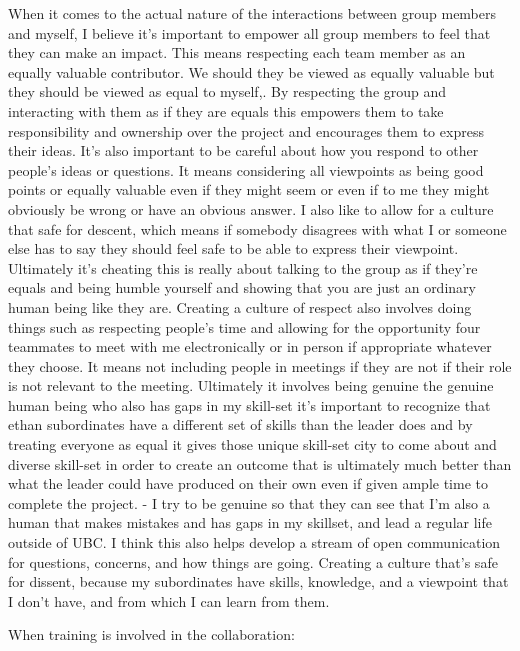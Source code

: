\documentclass[]{article}
\begin{document}
When it comes to the actual nature of the interactions between group members and myself, I believe it's important to empower all group members to feel that they can make an impact. This means respecting each team member as an equally valuable contributor. We should they be viewed as equally valuable but they should be viewed as equal to myself,. By respecting the group and interacting with them as if they are equals this empowers them to take responsibility and ownership over the project and encourages them to express their ideas. It's also important to be careful about how you respond to other people's ideas or questions. It means considering all viewpoints as being good points or equally valuable even if they might seem or even if to me they might obviously be wrong or have an obvious answer. I also like to allow for a culture that safe for descent, which means if somebody disagrees with what I or someone else has to say they should feel safe to be able to express their viewpoint. Ultimately it's cheating this is really about talking to the group as if they're equals and being humble yourself and showing that you are just an ordinary human being like they are. Creating a culture of respect also involves doing things such as respecting people's time and allowing for the opportunity four teammates to meet with me electronically or in person if appropriate whatever they choose. It means not including people in meetings if they are not if their role is not relevant to the meeting. Ultimately it involves being genuine the genuine human being who also has gaps in my skill-set it's important to recognize that ethan subordinates have a different set of skills than the leader does and by treating everyone as equal it gives those unique skill-set city to come about and diverse skill-set in order to create an outcome that is ultimately much better than what the leader could have produced on their own even if given ample time to complete the project. - I try to be genuine so that they can see that I'm also a human that makes mistakes and has gaps in my skillset, and lead a regular life outside of UBC. I think this also helps develop a stream of open communication for questions, concerns, and how things are going. Creating a culture that's safe for dissent, because my subordinates have skills, knowledge, and a viewpoint that I don't have, and from which I can learn from them.

When training is involved in the collaboration:
\end{document}
